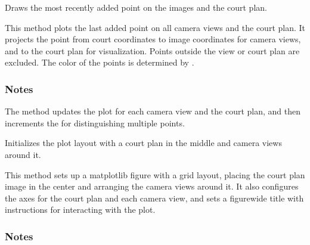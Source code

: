 \documentclass[letterpaper,10pt,english]{sphinxmanual}
\begin{document}
\begin{fulllineitems}
\begin{fulllineitems}
\end{fulllineitems}


\begin{fulllineitems}
\label{\detokenize{CameraUtils:CameraUtils.PlotCameras.DrawPoints}}
\pysigstartsignatures
{}
\pysigstopsignatures
\sphinxAtStartPar
Draws the most recently added point on the images and the court plan.

\sphinxAtStartPar
This method plots the last added point on all camera views and the court plan.
It projects the point from court coordinates to image coordinates for camera views, and to the court plan for visualization. Points outside the view or court plan are excluded. The color of the points is determined by .
\subsubsection*{Notes}

\sphinxAtStartPar
The method updates the plot for each camera view and the court plan, and then increments the  for distinguishing multiple points.

\end{fulllineitems}


\begin{fulllineitems}
\label{\detokenize{CameraUtils:id26}}
\pysigstartsignatures
{}
\pysigstopsignatures
\sphinxAtStartPar
Initializes the plot layout with a court plan in the middle and camera views around it.

\sphinxAtStartPar
This method sets up a matplotlib figure with a grid layout, placing the court plan image in the center and arranging the camera views around it. It also configures the axes for the court plan and each camera view, and sets a figure\sphinxhyphen{}wide title with instructions for interacting with the plot.
\subsubsection*{Notes}


\end{fulllineitems}
\end{fulllineitems}
\end{document}
